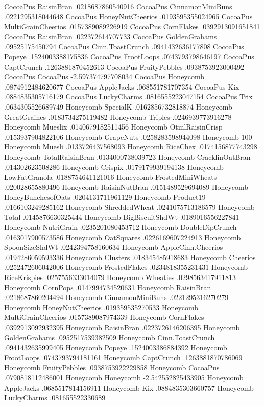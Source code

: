 CocoaPus	RaisinBran	.0218687860540916
CocoaPus	CinnamonMiniBuns	.0221295318044648
CocoaPus	HoneyNutCheerios	.0193595355024965
CocoaPus	MultiGrainCheerios	.0157389089226919
CocoaPus	CornFlakes	.0392913091651841
CocoaPus	RaisinBran	.022372614707733
CocoaPus	GoldenGrahams	.09525175450794
CocoaPus	Cinn.ToastCrunch	.0941432636177808
CocoaPus	Popeye	.1524003388175836
CocoaPus	FrootLoops	.0743793798646197
CocoaPus	CaptCrunch	.1263881870452613
CocoaPus	FruityPebbles	.0938753923000492
CocoaPus	CocoaPus	-2.597374797708034
CocoaPus	Honeycomb	.0874912484620677
CocoaPus	AppleJacks	.068551781707354
CocoaPus	Kix	.0884835305716179
CocoaPus	LuckyCharms	.0816555223047154
CocoaPus	Trix	.0634305526689749
Honeycomb	SpecialK	.0162856732818874
Honeycomb	GreatGraines	.0183734275119482
Honeycomb	Triples	.0246939773916278
Honeycomb	Mueslix	.0140679182511456
Honeycomb	OtmlRaisinCrisp	.0153937904822106
Honeycomb	GrapeNuts	.0258283598944098
Honeycomb	100%
Honeycomb	Muesli	.0133726437568093
Honeycomb	RiceChex	.0174156877743298
Honeycomb	TotalRaisinBran	.0134000738039723
Honeycomb	CracklinOatBran	.014302623508286
Honeycomb	Crispix	.0179179939194138
Honeycomb	LowFatGranola	.0188754641121016
Honeycomb	FrostedMiniWheats	.020028655880496
Honeycomb	RaisinNutBran	.0151489529694089
Honeycomb	HoneyBunchesofOats	.0204131711961129
Honeycomb	Product19	.0166103249285162
Honeycomb	ShreddedWheat	.0241075713186579
Honeycomb	Total	.0145876630325444
Honeycomb	BigBiscuitShdWt	.0189016556227841
Honeycomb	NutriGrain	.0235201080453712
Honeycomb	DoubleDipCrunch	.0163017900573586
Honeycomb	OatSquares	.0226169607224913
Honeycomb	SpoonSizeShdWt	.0242394758160634
Honeycomb	AppleCinn.Cheerios	.0194286059593336
Honeycomb	Clusters	.018345485918683
Honeycomb	Cheerios	.0252472606042006
Honeycomb	FrostedFlakes	.0234818355231431
Honeycomb	RiceKrispies	.0257556333014079
Honeycomb	Wheaties	.0298563417911813
Honeycomb	CornPops	.0147994734520631
Honeycomb	RaisinBran	.0218687860204494
Honeycomb	CinnamonMiniBuns	.0221295316270279
Honeycomb	HoneyNutCheerios	.019359535270533
Honeycomb	MultiGrainCheerios	.0157389087974339
Honeycomb	CornFlakes	.0392913092932395
Honeycomb	RaisinBran	.0223726146206395
Honeycomb	GoldenGrahams	.0952517539382509
Honeycomb	Cinn.ToastCrunch	.0941432635999405
Honeycomb	Popeye	.1524003386884392
Honeycomb	FrootLoops	.0743793794181161
Honeycomb	CaptCrunch	.1263881870786069
Honeycomb	FruityPebbles	.0938753922229858
Honeycomb	CocoaPus	.0790818112486001
Honeycomb	Honeycomb	-2.542552825433905
Honeycomb	AppleJacks	.0685517814156911
Honeycomb	Kix	.0884835303660757
Honeycomb	LuckyCharms	.081655522330689
